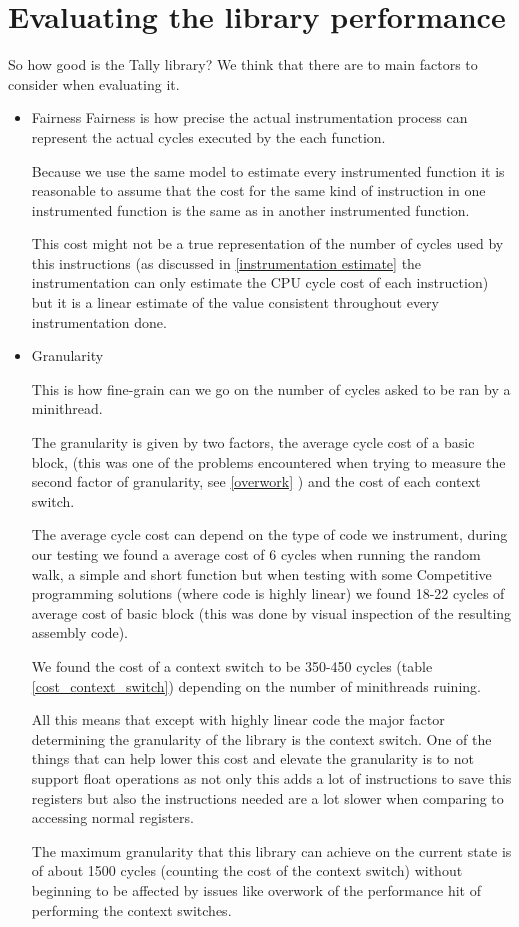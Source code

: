 \documentclass[12pt,a4paper]{report}
\begin{document}
\section{Evaluating the library performance}
So how good is the Tally library? We think that there are to main factors to consider when evaluating it.
\begin{itemize}

    \item Fairness
    Fairness is how precise the actual instrumentation process can represent the actual cycles executed by the each function.
    
    Because we use the same model to estimate every instrumented function it is reasonable to assume that the cost for the same kind of instruction in one instrumented function is the same as in another instrumented function.
    
    This cost might not be a true representation of the number of cycles used by this instructions (as discussed in \ref{instrumentation estimate} the instrumentation can only estimate the CPU cycle cost of each instruction) but it is a linear estimate of the value consistent throughout every instrumentation done.  
    
    \item Granularity
    
    This is how fine-grain can we go on the number of cycles asked to be ran by a minithread.
    
    The granularity is given by two factors, the average cycle cost of a basic block, (this was one of the problems encountered when trying to measure the second factor of granularity, see \ref{overwork} ) and the cost of each context switch.
    
    The average cycle cost can depend on the type of code we instrument, during our testing we found a average cost of 6 cycles when running the random walk, a simple and short function but when testing with some Competitive programming solutions (where code is highly linear) we found  18-22 cycles of average cost of basic block (this was done by visual inspection of the resulting assembly code).
    
    We found the cost of a context switch to be 350-450 cycles (table \ref{cost_context_switch}) depending on the number of minithreads ruining. 
    
    All this means that except with highly linear code the major factor determining the granularity of the library is the context switch. One of the things that can help lower this cost and elevate the granularity is to not support float operations as not only this adds a lot of instructions to save this registers but also the instructions needed are a lot slower when comparing to accessing normal registers. 
    
    The maximum granularity that this library can achieve on the current state is of about 1500 cycles (counting the cost of the context switch) without beginning to be affected by issues like overwork of the performance hit of performing the context switches.
\end{itemize}
\end{document}
